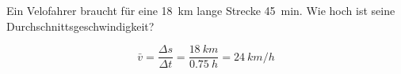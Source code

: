 
\begin{aufgabe}
	Ein Velofahrer braucht für eine \SI{18}{km} lange Strecke \SI{45}{min}. Wie hoch ist seine Durchschnittsgeschwindigkeit?
	\begin{loesung}
		\begin{equation*}
		\bar{v}=\frac{\Delta s}{\Delta t}=\frac{\SI{18}{km}}{\SI{0.75}{h}}=\SI{24}{km/h}
		\end{equation*}
	\end{loesung}
\end{aufgabe}
